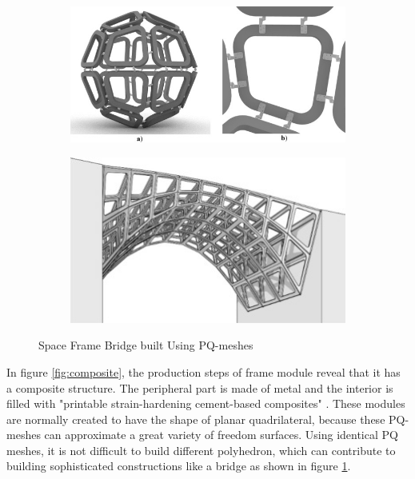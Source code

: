 \begin{figure}[t]
	\centering
	\begin{subfigure}[t]{0.4\textwidth}
		\includegraphics[width=1\textwidth]{fig/formwork.jpg}
	\end{subfigure}
	\begin{subfigure}[t]{0.4\textwidth}
		\includegraphics[width=1\textwidth]{fig/bridge.jpg}
	\end{subfigure}
	\caption{Space Frame Bridge built Using PQ-meshes}
	\label{fig:polyhedron}
\end{figure}

In figure \ref{fig:composite}, the production steps of frame module reveal that it has a composite structure. The peripheral part is made of metal and the interior is filled with "printable strain-hardening cement-based composites" \cite{IVANIUK2022}. These modules are normally created to have the shape of planar quadrilateral, because these PQ-meshes can approximate a great variety of freedom surfaces. Using identical PQ meshes, it is not difficult to build different polyhedron, which can contribute to building sophisticated constructions like a bridge as shown in figure \ref{fig:polyhedron}.


